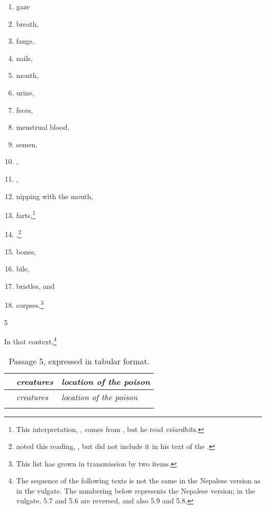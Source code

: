 \begin{translation}
\begin{multicols}{2}
\begin{enumerate}
\item gaze       			    %
\item  breath,       			%
\item fangs, 					%
\item nails, 					 %
\item mouth,      			  %
\item urine,					%
\item feces,					%
\item menstrual blood,   %
\item semen,				  %
\item {},				%
\item {}, %
\item nipping with the mouth,  %
\item farts,\footnote{This interpretation, ,
    comes from , but he read \emph{viśardhita}.} %
    \item {},\footnote{ noted this
        reading, , but did not include it in his text of the
        \SS.} %
        \item  bones, %
        \item  bile, %
        \item  bristles, and  %
        \item corpses.\footnote{This list has grown in transmission by two
            items.} %
\end{enumerate} 
\end{multicols} 

\bigskip

\item [5]  

In that context,\footnote{The sequence of the following texts is not the same 
in the Nepalese version as in the vulgate.  The numbering below represents 
the Nepalese version; in the vulgate, 5.7 and 5.6 are reversed, and also 5.9 
and 5.8.}

\noindent
{\centering\small \begin{longtable}{l 
>{\raggedright\arraybackslash}p{} 
>{\raggedright\arraybackslash}p{}} 
\caption{Passage 5,  expressed in tabular  format.} \\
& \emph{creatures} & \emph{location of the poison}\\ 
\midrule 
\endfirsthead  
& \emph{creatures} & \emph{location of the poison}\\ 
\midrule 
\endhead
\endfoot


\end{longtable}}
\end{translation}
